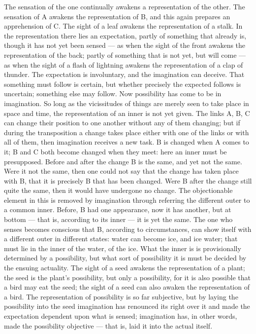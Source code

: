 \documentclass[12pt]{book}
\begin{document}
The sensation of the one continually awakens a representation of the other.
The sensation of A awakens the representation of B, and this again prepares an
apprehension of C. The sight of a leaf awakens the representation of a stalk.
In the representation there lies an expectation, partly of something that
already is, though it has not yet been sensed --- as when the sight of the
front awakens the representation of the back; partly of something that is not
yet, but will come --- as when the sight of a flash of lightning awakens the
representation of a clap of thunder. The expectation is involuntary, and the
imagination can deceive. That something must follow is certain, but whether
precisely the expected follows is uncertain; something else may follow. Now
possibility has come to be in imagination. So long as the vicissitudes of
things are merely seen to take place in space and time, the representation of
an inner is not yet given. The links A, B, C can change their position to one
another without any of them changing; but if during the transposition a change
takes place either with one of the links or with all of them, then imagination
receives a new task. B is changed when A comes to it; B and C both become
changed when they meet: here an inner must be presupposed. Before and after the
change B is the same, and yet not the same. Were it not the same, then one
could not say that the change has taken place with B, that it is precisely B
that has been changed. Were B after the change still quite the same, then it
would have undergone no change. The objectionable element in this is removed by
imagination through referring the different outer to a common inner. Before, B
had one appearance, now it has another, but at bottom --- that is, according to
its inner --- it is yet the same. The one who senses becomes conscious that B,
according to circumstances, can show itself with a different outer in different
states: water can become ice, and ice water; that must lie in the inner of the
water, of the ice. What the inner is is provisionally determined by a
possibility, but what sort of possibility it is must be decided by the
ensuing actuality. The sight of a seed awakens the representation of a plant;
the seed is the plant's possibility, but only a possibility, for it is also
possible that a bird may eat the seed; the sight of a seed can also awaken the
representation of a bird. The representation of possibility is so far
subjective, but by laying the possibility into the seed imagination has
renounced its right over it and made the expectation dependent upon what is
sensed; imagination has, in other words, made the possibility objective ---
that is, laid it into the actual itself.
\end{document}

